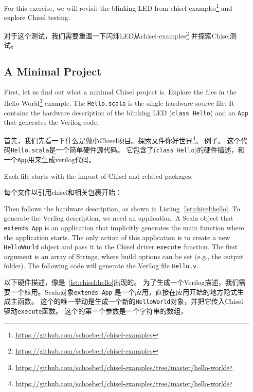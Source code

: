 \documentclass[%
    10pt,
    headinclude, footexclude,
    openright, %
    notitlepage,
    cleardoubleempty,
    headsepline,
    pointlessnumbers,
    bibtotoc, idxtotoc,
    ]{scrbook}
\newcommand{\code}[1]{{\small{\texttt{#1}}}}
\newcommand{\todo}[1]{{\emph{TODO: #1}}}
\newcommand{\myref}[2]{\href{#1}{#2}}
\renewcommand{\myref}[2]{{#2}{\footnote{\url{#1}}}}
\renewcommand{\todo}[1]{}
\begin{document}
For this exercise, we will revisit the blinking LED from
\myref{https://github.com/schoeberl/chisel-examples}{chisel-examples}
and explore Chisel testing. \todo{Also use the ALU example.}

对于这个测试，我们需要重温一下闪烁LED从\myref{https://github.com/schoeberl/chisel-examples}{chisel-examples}
并探索Chisel测试。

\subsection{A Minimal Project}

First, let us find out what a minimal Chisel project is. Explore the files in the
\myref{https://github.com/schoeberl/chisel-examples/tree/master/hello-world}{Hello World}
example.
The \code{Hello.scala} is the single hardware source file.
It contains the hardware description of the blinking LED (\code{class Hello})
and an \code{App} that generates the Verilog code.

首先，我们先看一下什么是做小Chisel项目。探索文件\myref{https://github.com/schoeberl/chisel-examples/tree/master/hello-world}{你好世界}。
例子。
这个代码\code{Hello.scala}是一个简单硬件源代码。
它包含了(\code{class Hello})的硬件描述，和一个\code{App}用来生成verilog代码。

Each file starts with the import of Chisel and related packages:

每个文件以引用chisel和相关包裹开始：


\noindent Then follows the hardware description, as shown in Listing~\ref{lst:chisel:hello}.
To generate the Verilog description, we need an application. A Scala object that \code{extends App}
is an application that implicitly generates the main function where the application starts.
The only action of this application is to create a new \code{HelloWorld} object and pass it
to the Chisel driver \code{execute} function. The first argument is an array of Strings,
where build options can be set (e.g., the output folder). The following code will
generate the Verilog file \code{Hello.v}.

\noindent 以下硬件描述，像是~\ref{lst:chisel:hello}出现的。
为了生成一个Verilog描述，我们需要一个应用。Scala对象\code{extends App}
是一个应用，直接在应用开始的地方隐式生成主函数。
这个的唯一举动是生成一个新的\code{HelloWorld}对象，并把它传入Chisel驱动\code{execute}函数。
这个的第一个参数是一个字符串的数组，
\end{document}
